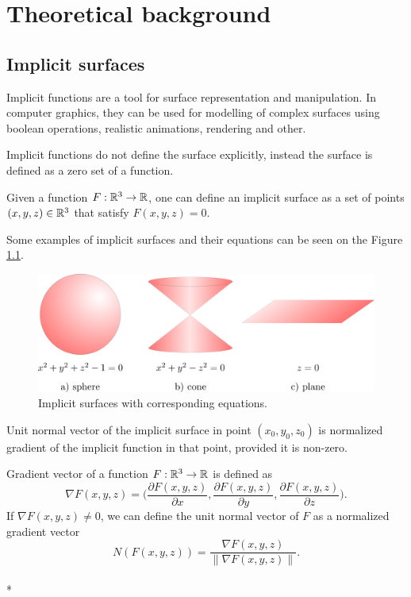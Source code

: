 \chapter{Theoretical background}
\label{chap2} %

\section{Implicit surfaces}
\label{sub2.1}

Implicit functions are a tool for surface representation and manipulation.
In computer graphics, they can be used for modelling of complex surfaces
using boolean operations, realistic animations, rendering and other.

Implicit functions do not define the surface explicitly, instead
the surface is defined as a zero set of a function.
\begin{definition}
    Given a function $F: \mathbb{R}^3 \to \mathbb{R}$, one can define an implicit surface
    as a set of points $(x, y, z)\in \mathbb{R}^3$ that satisfy $F(x, y, z) = 0$.
\end{definition}

Some examples of implicit surfaces and their equations can be seen on
the Figure \ref{img:1}.

\begin{figure}
    \centerline{\includegraphics[scale=0.5]{images/img1}}
    \caption[Implicit surfaces with corresponding equations]
    {Implicit surfaces with corresponding equations.}
    \label{img:1}
\end{figure}

Unit normal vector of the implicit surface in point $(x_0, y_0, z_0)$ is
normalized gradient of the implicit function in that point, provided it is
non-zero.

\begin{definition}
    Gradient vector of a function $F:\mathbb{R}^3 \to \mathbb{R}$ is defined as 
    $$\nabla F(x, y, z) = \bigg(\frac{\partial F(x, y, z)}{\partial x}, \frac{\partial F(x, y, z)}{\partial y}, 
    \frac{\partial F(x, y, z)}{\partial z}\bigg).$$
    If $\nabla F(x,y,z) \neq 0$, we can define the unit normal vector of $F$ as 
    a normalized gradient vector
    $$N(F(x, y, z))  = \frac{\nabla F(x, y, z)}{\| \nabla F(x, y, z) \|}.$$
    \\*
\end{definition}

